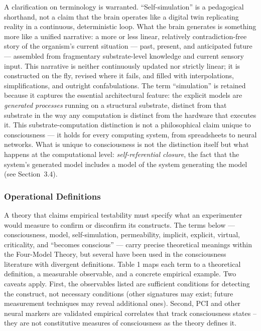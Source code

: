 \documentclass[12pt]{article}
\begin{document}
A clarification on terminology is warranted. ``Self-simulation'' is a pedagogical shorthand, not a claim that the brain operates like a digital twin replicating reality in a continuous, deterministic loop. What the brain generates is something more like a unified narrative: a more or less linear, relatively contradiction-free story of the organism's current situation --- past, present, and anticipated future --- assembled from fragmentary substrate-level knowledge and current sensory input. This narrative is neither continuously updated nor strictly linear; it is constructed on the fly, revised where it fails, and filled with interpolations, simplifications, and outright confabulations. The term ``simulation'' is retained because it captures the essential architectural feature: the explicit models are \emph{generated processes} running on a structural substrate, distinct from that substrate in the way any computation is distinct from the hardware that executes it. This substrate-computation distinction is not a philosophical claim unique to consciousness --- it holds for every computing system, from spreadsheets to neural networks. What is unique to consciousness is not the distinction itself but what happens at the computational level: \emph{self-referential closure}, the fact that the system's generated model includes a model of the system generating the model (see Section~3.4).

\subsubsection{Operational Definitions}

A theory that claims empirical testability must specify what an experimenter would measure to confirm or disconfirm its constructs. The terms below --- consciousness, model, self-simulation, permeability, implicit, explicit, virtual, criticality, and ``becomes conscious'' --- carry precise theoretical meanings within the Four-Model Theory, but several have been used in the consciousness literature with divergent definitions. Table 1 maps each term to a theoretical definition, a measurable observable, and a concrete empirical example. Two caveats apply. First, the observables listed are sufficient conditions for detecting the construct, not necessary conditions (other signatures may exist; future measurement techniques may reveal additional ones). Second, PCI and other neural markers are validated empirical correlates that track consciousness states -- they are not constitutive measures of consciousness as the theory defines it.
\end{document}
